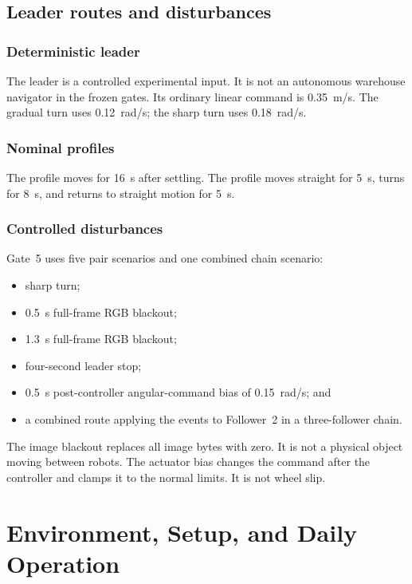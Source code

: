 \documentclass[11pt,oneside,openany]{book}
\newcommand{\file}[1]{\path{#1}}
\begin{document}
\chapter{Leader routes and disturbances}

\section{Deterministic leader}

The leader is a controlled experimental input. It is not an autonomous warehouse navigator in the frozen gates. Its ordinary linear command is 0.35~m/s. The gradual turn uses 0.12~rad/s; the sharp turn uses 0.18~rad/s.

\section{Nominal profiles}

The \file{straight} profile moves for 16~s after settling. The \file{turn} profile moves straight for 5~s, turns for 8~s, and returns to straight motion for 5~s.

\section{Controlled disturbances}

Gate~5 uses five pair scenarios and one combined chain scenario:
\begin{itemize}
  \item sharp turn;
  \item 0.5~s full-frame RGB blackout;
  \item 1.3~s full-frame RGB blackout;
  \item four-second leader stop;
  \item 0.5~s post-controller angular-command bias of 0.15~rad/s; and
  \item a combined route applying the events to Follower~2 in a three-follower chain.
\end{itemize}

The image blackout replaces all image bytes with zero. It is not a physical object moving between robots. The actuator bias changes the command after the controller and clamps it to the normal limits. It is not wheel slip.

\part{Environment, Setup, and Daily Operation}
\end{document}
